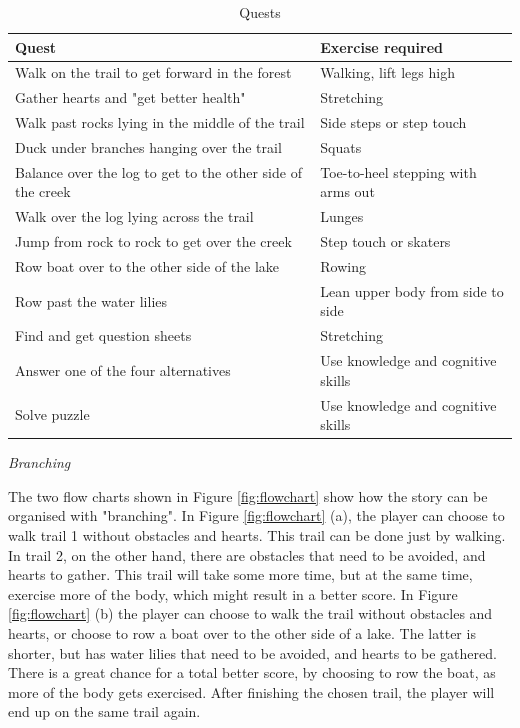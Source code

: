 \begin{table}
\begin{tabular}{|>{\raggedright}p{}|p{}|}
\hline
\textbf{Quest} & \textbf{Exercise required}  \\ \hline
Walk on the trail to get forward in the forest & Walking, lift legs high \\ \hline
Gather hearts and "get better health" &  Stretching \\ \hline
Walk past rocks lying in the middle of the trail & Side steps or step touch  \\ \hline
Duck under branches hanging over the trail & Squats
\\ \hline
Balance over the log to get to the other side of the creek & Toe-to-heel stepping with arms out \\ \hline
Walk over the log lying across the trail & Lunges \\ \hline
Jump from rock to rock to get over the creek & Step touch or skaters \\ \hline
Row boat over to the other side of the lake & Rowing \\ \hline
Row past the water lilies & Lean upper body from side to side \\ \hline
Find and get question sheets  & Stretching \\ \hline
Answer one of the four alternatives & Use knowledge and cognitive skills \\ \hline
Solve puzzle & Use knowledge and cognitive skills \\ \hline
\end{tabular}
\caption[Quests in the "Nature trail" game]{Quests}
\label{tab:quests1}
\end{table}
 \newpage
 
\emph{Branching}

The two flow charts shown in Figure \ref{fig:flowchart} show how the story can be organised with "branching". In Figure \ref{fig:flowchart} (a), the player can choose to walk trail 1 without obstacles and hearts. This trail can be done just by walking. In trail 2, on the other hand, there are obstacles that need to be avoided, and hearts to gather. This trail will take some more time, but at the same time, exercise more of the body, which might result in a better score. In Figure \ref{fig:flowchart} (b) the player can choose to walk the trail without obstacles and hearts, or choose to row a boat over to the other side of a lake. The latter is shorter, but has water lilies that need to be avoided, and hearts to be gathered. There is a great chance for a total better score, by choosing to row the boat, as more of the body gets exercised. After finishing the chosen trail, the player will end up on the same trail again.

